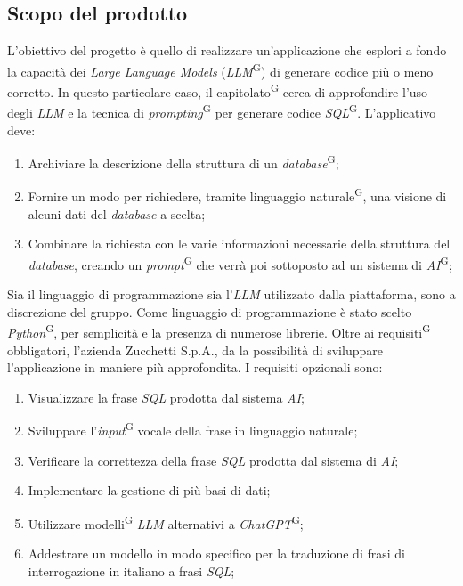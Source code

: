 \documentclass[5pt]{article}
\begin{document}
\subsection{Scopo del prodotto}
L'obiettivo del progetto è quello di realizzare un'applicazione che esplori a fondo la capacità dei \textit{Large Language Models} (\textit{LLM}\textsuperscript{G}) di generare codice più o meno corretto. In questo particolare caso, il capitolato\textsuperscript{G} cerca di approfondire l'uso degli \textit{LLM} e la tecnica di \textit{prompting}\textsuperscript{G} per generare codice \textit{SQL}\textsuperscript{G}.
L'applicativo deve:
\begin{enumerate}
    \item Archiviare la descrizione della struttura di un \textit{database}\textsuperscript{G};
    \item Fornire un modo per richiedere, tramite linguaggio naturale\textsuperscript{G}, una visione di alcuni dati del \textit{database} a scelta;
    \item Combinare la richiesta con le varie informazioni necessarie della struttura del \textit{database}, creando un 
    \textit{prompt}\textsuperscript{G} che verrà poi sottoposto ad un sistema di \textit{AI}\textsuperscript{G};
\end{enumerate}
Sia il linguaggio di programmazione sia l'\textit{LLM} utilizzato dalla piattaforma, sono a discrezione del gruppo. Come linguaggio di programmazione è stato scelto \textit{Python}\textsuperscript{G}, per semplicità e la presenza di numerose librerie.
Oltre ai requisiti\textsuperscript{G} obbligatori, l'azienda Zucchetti S.p.A., da la possibilità di sviluppare l'applicazione in maniere più approfondita. I requisiti opzionali sono:
\begin{enumerate}
    \item Visualizzare la frase \textit{SQL} prodotta dal sistema \textit{AI};
    \item Sviluppare l'\textit{input}\textsuperscript{G} vocale della frase in linguaggio naturale;
    \item Verificare la correttezza della frase \textit{SQL} prodotta dal sistema di \textit{AI};
    \item Implementare la gestione di più basi di dati;
    \item Utilizzare modelli\textsuperscript{G} \textit{LLM} alternativi a \textit{ChatGPT}\textsuperscript{G};
    \item Addestrare un modello in modo specifico per la traduzione di frasi di interrogazione in italiano a frasi \textit{SQL};
\end{enumerate}
\end{document}
